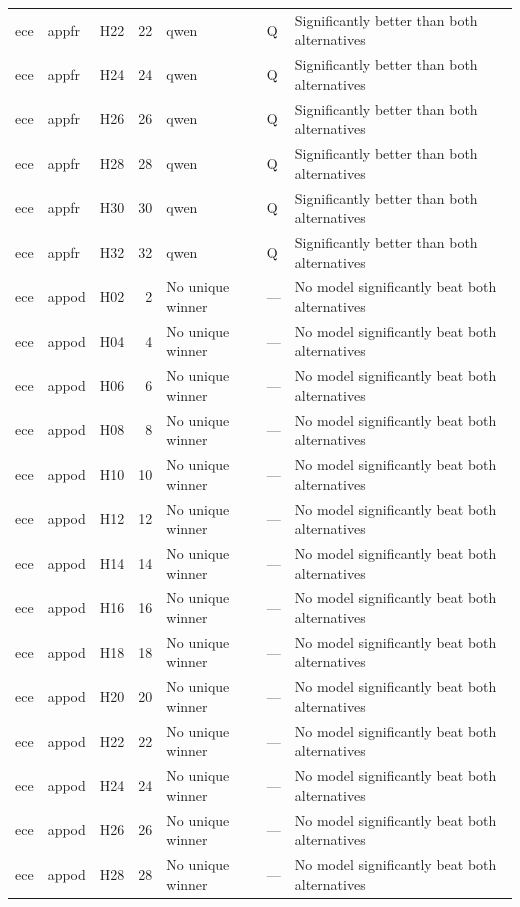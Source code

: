 \begin{longtable}{lllrlll}
ece & appfr & H22 & 22 & qwen & Q & Significantly better than both alternatives \\
ece & appfr & H24 & 24 & qwen & Q & Significantly better than both alternatives \\
ece & appfr & H26 & 26 & qwen & Q & Significantly better than both alternatives \\
ece & appfr & H28 & 28 & qwen & Q & Significantly better than both alternatives \\
ece & appfr & H30 & 30 & qwen & Q & Significantly better than both alternatives \\
ece & appfr & H32 & 32 & qwen & Q & Significantly better than both alternatives \\
ece & appod & H02 & 2 & No unique winner & — & No model significantly beat both alternatives \\
ece & appod & H04 & 4 & No unique winner & — & No model significantly beat both alternatives \\
ece & appod & H06 & 6 & No unique winner & — & No model significantly beat both alternatives \\
ece & appod & H08 & 8 & No unique winner & — & No model significantly beat both alternatives \\
ece & appod & H10 & 10 & No unique winner & — & No model significantly beat both alternatives \\
ece & appod & H12 & 12 & No unique winner & — & No model significantly beat both alternatives \\
ece & appod & H14 & 14 & No unique winner & — & No model significantly beat both alternatives \\
ece & appod & H16 & 16 & No unique winner & — & No model significantly beat both alternatives \\
ece & appod & H18 & 18 & No unique winner & — & No model significantly beat both alternatives \\
ece & appod & H20 & 20 & No unique winner & — & No model significantly beat both alternatives \\
ece & appod & H22 & 22 & No unique winner & — & No model significantly beat both alternatives \\
ece & appod & H24 & 24 & No unique winner & — & No model significantly beat both alternatives \\
ece & appod & H26 & 26 & No unique winner & — & No model significantly beat both alternatives \\
ece & appod & H28 & 28 & No unique winner & — & No model significantly beat both alternatives \\

\end{longtable}

